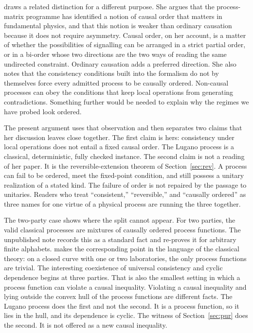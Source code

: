 \documentclass[11pt]{article}
\begin{document}
\citet{adlam2023} draws a related distinction for a different purpose. She argues that the process-matrix programme has identified a notion of causal order that matters in fundamental physics, and that this notion is weaker than ordinary causation because it does not require asymmetry. Causal order, on her account, is a matter of whether the possibilities of signalling can be arranged in a strict partial order, or in a bi-order whose two directions are the two ways of reading the same undirected constraint. Ordinary causation adds a preferred direction. She also notes that the consistency conditions built into the formalism do not by themselves force every admitted process to be causally ordered. Non-causal processes can obey the conditions that keep local operations from generating contradictions. Something further would be needed to explain why the regimes we have probed look ordered.

The present argument uses that observation and then separates two claims that her discussion leaves close together. The first claim is hers: consistency under local operations does not entail a fixed causal order. The Lugano process is a classical, deterministic, fully checked instance. The second claim is not a reading of her paper. It is the reversible-extension theorem of Section~\ref{sec:rev}. A process can fail to be ordered, meet the fixed-point condition, and still possess a unitary realization of a stated kind. The failure of order is not repaired by the passage to unitaries. Readers who treat ``consistent,'' ``reversible,'' and ``causally ordered'' as three names for one virtue of a physical process are running the three together.

The two-party case shows where the split cannot appear. For two parties, the valid classical processes are mixtures of causally ordered process functions. The unpublished note records this as a standard fact and re-proves it for arbitrary finite alphabets. \citet{adlam2023} makes the corresponding point in the language of the classical theory: on a closed curve with one or two laboratories, the only process functions are trivial. The interesting coexistence of universal consistency and cyclic dependence begins at three parties. That is also the smallest setting in which a process function can violate a causal inequality. Violating a causal inequality and lying outside the convex hull of the process functions are different facts. The Lugano process does the first and not the second. It is a process function, so it lies in the hull, and its dependence is cyclic. The witness of Section~\ref{sec:pur} does the second. It is not offered as a new causal inequality.
\end{document}
